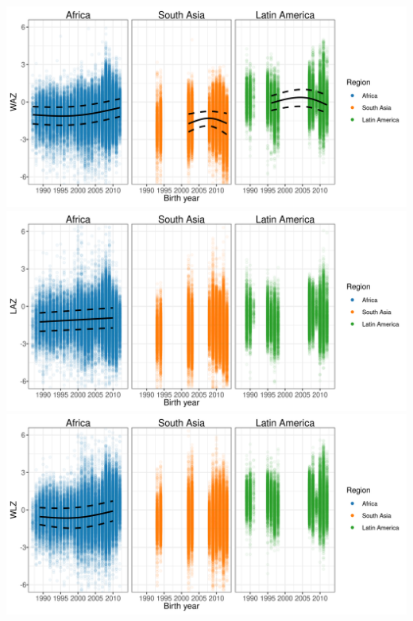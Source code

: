 \documentclass[
  9pt,
]{book}
\begin{document}
\includegraphics[width=33.33in]{figures//shared/waz_secular_trend_monthly}
\includegraphics[width=33.33in]{figures//shared/laz_secular_trend_monthly}
\includegraphics[width=33.33in]{figures//shared/wlz_secular_trend_monthly}

  
\end{document}
